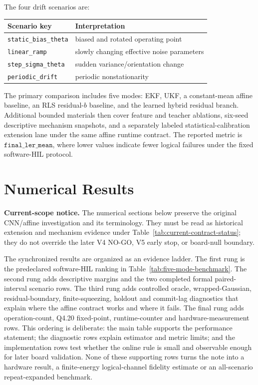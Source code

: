 \documentclass[11pt]{article}
\begin{document}
The four drift scenarios are:
\begin{center}
\small
\begin{tabular}{ll}
\toprule
Scenario key & Interpretation \\
\midrule
\texttt{static\_bias\_theta} & biased and rotated operating point \\
\texttt{linear\_ramp} & slowly changing effective noise parameters \\
\texttt{step\_sigma\_theta} & sudden variance/orientation change \\
\texttt{periodic\_drift} & periodic nonstationarity \\
\bottomrule
\end{tabular}
\end{center}

The primary comparison includes five modes: EKF, UKF, a constant-mean affine
baseline, an RLS residual-\(b\) baseline, and the learned hybrid residual
branch.  Additional bounded materials then cover feature and teacher
ablations, six-seed descriptive mechanism snapshots, and a separately labeled
statistical-calibration extension lane under the same affine runtime contract.
The reported metric is \(\texttt{final\_ler\_mean}\), where lower values
indicate fewer logical failures under the fixed software-HIL protocol.

\section{Numerical Results}

\noindent\textbf{Current-scope notice.}  The numerical sections below preserve
the original CNN/affine investigation and its terminology.  They must be read
as historical extension and mechanism evidence under
Table~\ref{tab:current-contract-status}; they do not override the later V4
NO-GO, V5 early stop, or board-null boundary.

The synchronized results are organized as an evidence ladder.  The first rung
is the predeclared software-HIL ranking in
Table~\ref{tab:five-mode-benchmark}.  The second rung adds descriptive margins
and the two completed formal paired-interval scenario rows.  The third rung
adds controlled oracle, wrapped-Gaussian, residual-boundary, finite-squeezing,
holdout and commit-lag diagnostics that explain where the affine contract
works and where it fails.  The final rung adds operation-count, Q4.20
fixed-point, runtime-counter and hardware-measurement rows.  This ordering is
deliberate: the main table supports the performance statement; the diagnostic
rows explain estimator and metric limits; and the implementation rows test
whether the online rule is small and observable enough for later board
validation.  None of these supporting rows turns the note into a hardware
result, a finite-energy logical-channel fidelity estimate or an all-scenario
repeat-expanded benchmark.
\end{document}
